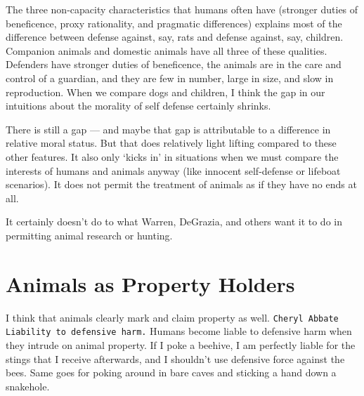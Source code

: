 \documentclass[12pt]{book}
\begin{document}
	The three non-capacity characteristics that humans often have (stronger
	duties of beneficence, proxy rationality, and pragmatic differences)
	explains most of the difference between defense against, say, rats and
	defense against, say, children.  Companion animals and domestic animals
	have all three of these qualities.  Defenders have stronger duties of
	beneficence, the animals are in the care and control of a guardian, and
	they are few in number, large in size, and slow in reproduction. When we
	compare dogs and children, I think the gap in our intuitions about the
	morality of self defense certainly shrinks.

	There is still a gap --- and maybe that gap is attributable to a difference
	in relative moral status. But that does relatively light lifting compared to
	these other features. It also only ‘kicks in’ in situations when we must
	compare the interests of humans and animals anyway (like innocent
	self-defense or lifeboat scenarios). It does not permit the treatment of
	animals as if they have no ends at all.

	It certainly doesn’t do to what Warren, DeGrazia, and others want it to do
	in permitting animal research or hunting.

\section{Animals as Property Holders}

	I think that animals clearly mark and claim property as well.
	\texttt{Cheryl Abbate Liability to defensive harm.} Humans become liable to
	defensive harm when they intrude on animal property.  If I poke a beehive,
	I am perfectly liable for the stings that I receive afterwards, and I
	shouldn’t use defensive force against the bees.  Same goes for poking
	around in bare caves and sticking a hand down a snakehole.
\end{document}

